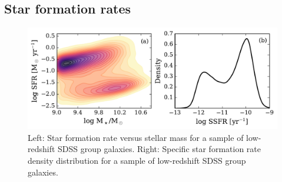 \subsection{Star formation rates}
\label{sec:sfr}

\begin{figure}[!ht]
  \centering
  \includegraphics[width=\textwidth]{m_sfr.pdf}
  \caption{Left: Star formation rate versus stellar mass for a sample
    of low-redshift SDSS group galaxies.  Right: Specific star
    formation rate density distribution for a sample of low-redshift
    SDSS group galaxies.}
  \label{fig:m_sfr}
\end{figure}

